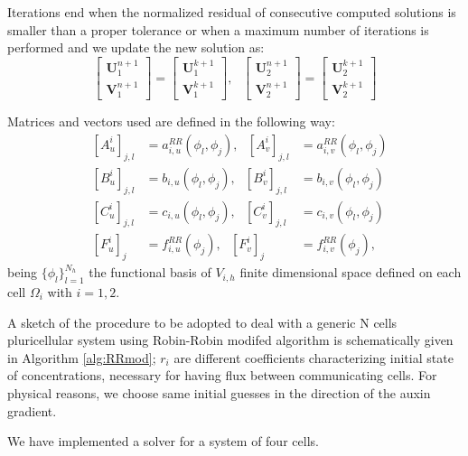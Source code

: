 Iterations end when the normalized residual of consecutive computed solutions is smaller than a proper tolerance or when a maximum number of iterations is performed and we update the new solution as:
 $$\begin{bmatrix} \mathbf{U}_1^{n+1} \\ \mathbf{V}_1^{n+1} \end{bmatrix} = \begin{bmatrix} \mathbf{U}_1^{k+1} \\ \mathbf{V}_1^{k+1} \end{bmatrix}, \ \ \ \begin{bmatrix} \mathbf{U}_2^{n+1} \\ \mathbf{V}_2^{n+1} \end{bmatrix} = \begin{bmatrix} \mathbf{U}_2^{k+1} \\ \mathbf{V}_2^{k+1} \end{bmatrix}$$

Matrices and vectors used are defined in the following way:
\begin{equation}
    \begin{aligned}
    & \left[ A_u^i\right]_{j,l} & = a_{i,u}^{RR}(\phi_l, \phi_j), \ \ \ \left[ A_v^i\right]_{j,l} & = a_{i,v}^{RR}(\phi_l, \phi_j) \\
    & \left[ B_u^i\right]_{j,l} & = b_{i,u}(\phi_l, \phi_j), \ \ \ \left[ B_v^i\right]_{j,l} & = b_{i,v}(\phi_l, \phi_j)\\
    & \left[ C_u^i\right]_{j,l} & = c_{i,u}(\phi_l, \phi_j),\ \ \ \left[ C_v^i\right]_{j,l} & = c_{i,v}(\phi_l, \phi_j)\\
    & \left[F_u^i\right]_{j} & = f_{i,u}^{RR}(\phi_j), \ \ \
    \left[F_v^i\right]_{j} & = f_{i,v}^{RR}(\phi_j),
    \end{aligned}
\end{equation}
being $\{\phi_l\}_{l = 1}^{N_h}$ the functional basis of $V_{i,h}$ finite dimensional space defined on each cell $\Omega_i$ with $i =1,2$.

A sketch of the procedure to be adopted to deal with a generic N cells pluricellular system using Robin-Robin modifed algorithm is schematically given in Algorithm \ref{alg:RRmod}; $r_i$ are different coefficients characterizing initial state of concentrations, necessary for having flux between communicating cells. For physical reasons, we choose same initial guesses in the direction of the auxin gradient.

We have implemented a solver for a system of four cells.

